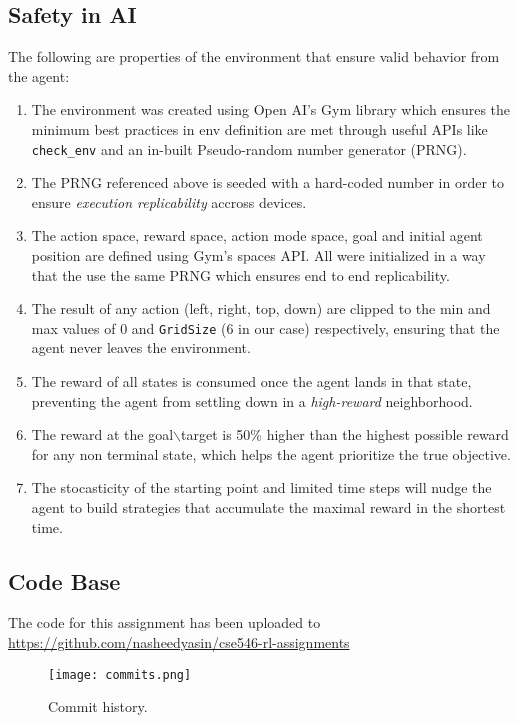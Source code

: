 \documentclass{article} %
\begin{document}
\subsection{Safety in AI}
The following are properties of the environment that ensure valid behavior from the agent:

\begin{enumerate}
    \item The environment was created using Open AI's Gym library \cite[]{1606.01540}
        which ensures the minimum best practices in env definition are met through useful
        APIs like \verb|check_env| and an in-built Pseudo-random number generator (PRNG).
    \item The PRNG referenced above is seeded with a hard-coded number in order to ensure
        \textit{execution replicability} accross devices.
    \item The action space, reward space, action mode space, goal and initial agent position
        are defined using Gym's spaces API. All were initialized in a way that the use the same
        PRNG which ensures end to end replicability.
    \item The result of any action (left, right, top, down) are clipped to the min and max
        values of 0 and \verb|GridSize| (6 in our case) respectively, ensuring that the
        agent never leaves the environment.
    \item The reward of all states is consumed once the agent lands in that state, preventing 
        the agent from settling down in a \textit{high-reward} neighborhood.
    \item The reward at the goal$\backslash$target is 50\% higher than the highest possible reward for
        any non terminal state, which helps the agent prioritize the true objective.
    \item The stocasticity of the starting point and limited time steps will nudge the agent
        to build strategies that accumulate the maximal reward in the shortest time.
\end{enumerate}

\subsection*{Code Base}
The code for this assignment has been uploaded to \url{https://github.com/nasheedyasin/cse546-rl-assignments}

\begin{figure}[h]
    \begin{center}
        \texttt{[image: commits.png]}
    \end{center}
    \caption{Commit history.}
\end{figure}

\printbibliography
\end{document}
